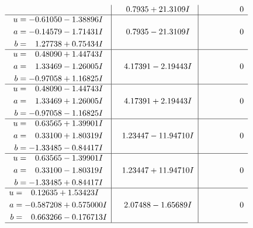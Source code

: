 \documentclass[1p]{elsarticle_modified}
\theoremstyle{definition}
\begin{document}
$$\begin{array}{c|c|c}
 & \phantom{-}0.7935 + 21.3109 I & \phantom{-0.000000 } 0 \\ \hline\begin{aligned}
u &= -0.61050 - 1.38896 I \\
a &= -0.14579 - 1.71431 I \\
b &= \phantom{-}1.27738 + 0.75434 I\end{aligned}
 & \phantom{-}0.7935 - 21.3109 I & \phantom{-0.000000 } 0 \\ \hline\begin{aligned}
u &= \phantom{-}0.48090 + 1.44743 I \\
a &= \phantom{-}1.33469 - 1.26005 I \\
b &= -0.97058 + 1.16825 I\end{aligned}
 & \phantom{-}4.17391 - 2.19443 I & \phantom{-0.000000 } 0 \\ \hline\begin{aligned}
u &= \phantom{-}0.48090 - 1.44743 I \\
a &= \phantom{-}1.33469 + 1.26005 I \\
b &= -0.97058 - 1.16825 I\end{aligned}
 & \phantom{-}4.17391 + 2.19443 I & \phantom{-0.000000 } 0 \\ \hline\begin{aligned}
u &= \phantom{-}0.63565 + 1.39901 I \\
a &= \phantom{-}0.33100 + 1.80319 I \\
b &= -1.33485 - 0.84417 I\end{aligned}
 & \phantom{-}1.23447 - 11.94710 I & \phantom{-0.000000 } 0 \\ \hline\begin{aligned}
u &= \phantom{-}0.63565 - 1.39901 I \\
a &= \phantom{-}0.33100 - 1.80319 I \\
b &= -1.33485 + 0.84417 I\end{aligned}
 & \phantom{-}1.23447 + 11.94710 I & \phantom{-0.000000 } 0 \\ \hline\begin{aligned}
u &= \phantom{-}0.12635 + 1.53423 I \\
a &= -0.587208 + 0.575000 I \\
b &= \phantom{-}0.663266 - 0.176713 I\end{aligned}
 & \phantom{-}2.07488 - 1.65689 I & \phantom{-0.000000 } 0\\
 \hline 
 \end{array}$$\newpage$$\begin{array}{c|c|c}  

\end{array}$$
\end{document}
